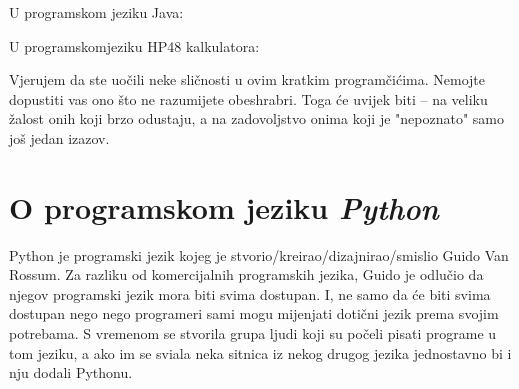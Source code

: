 	U programskom jeziku Java:

	
	U programskomjeziku HP48 kalkulatora:

	

	Vjerujem da ste uo\v{c}ili neke sli\v{c}nosti u ovim kratkim program\v{c}i\'{c}ima.
	Nemojte dopustiti vas ono \v{s}to ne razumijete obeshrabri. Toga \'{c}e uvijek
	biti -- na veliku \v zalost onih koji brzo odustaju, a na zadovoljstvo onima koji
	je "nepoznato" samo jo\v s jedan izazov.

\section{O programskom jeziku \emph{Python}}

	Python je programski jezik kojeg je stvorio/kreirao/dizajnirao/smislio Guido Van
	Rossum. Za razliku od komercijalnih programskih jezika, Guido je odlu\v{c}io da
	njegov programski jezik mora biti svima dostupan. I, ne samo da \'{c}e biti svima
	dostupan nego nego programeri sami mogu mijenjati doti\v{c}ni jezik prema svojim
	potrebama. S vremenom se stvorila grupa ljudi koji su po\v{c}eli pisati programe u
	tom jeziku, a ako im se svi\dj{}ala neka sitnica iz nekog drugog jezika jednostavno
	bi i nju dodali Pythonu.

